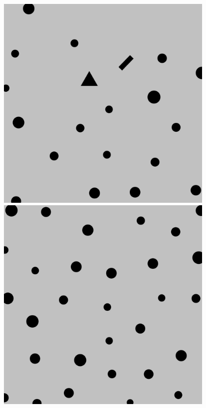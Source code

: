 \documentclass{beamer}
\begin{document}
\begin{frame}
\begin{figure}[H]
\begin{columns}
						\begin{column}{0.05\textwidth}
						\end{column}
						\begin{column}{0.14\textwidth}
							\includegraphics[width=1\linewidth]{graphics/test_model_20_1.png}
							\includegraphics[width=1\linewidth]{graphics/test_model_30_1.png}

\end{column}
\end{columns}
\end{figure}
\end{frame}
\end{document}
